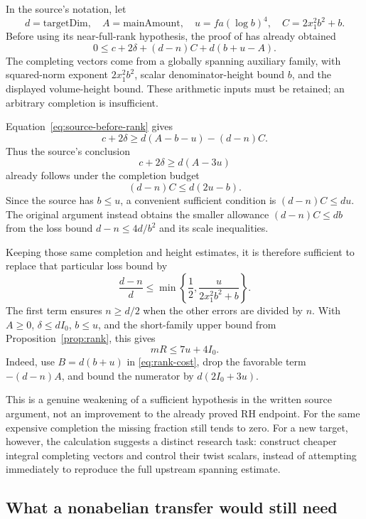 In the source's notation, let
\[
 d=\mathrm{targetDim},\quad A=\mathrm{mainAmount},\quad
 u=fa(\log b)^4,\quad C=2x_1^2b^2+b.
\]
Before using its near-full-rank hypothesis, the proof of  has already obtained
\begin{equation}\label{eq:source-before-rank}
 0\le c+2\delta+(d-n)C+d(b+u-A).
\end{equation}
The completing vectors come from a globally spanning auxiliary family, with squared-norm exponent $2x_1^2b^2$, scalar denominator-height bound $b$, and the displayed volume-height bound. These arithmetic inputs must be retained; an arbitrary completion is insufficient.\cite{long_source}

Equation~\eqref{eq:source-before-rank} gives
\[
 c+2\delta\ge d(A-b-u)-(d-n)C.
\]
Thus the source's conclusion
\[
                         c+2\delta\ge d(A-3u)
\]
already follows under the completion budget
\begin{equation}\label{eq:weaker-spanning}
                  (d-n)C\le d(2u-b).
\end{equation}
Since the source has $b\le u$, a convenient sufficient condition is $(d-n)C\le du$. The original argument instead obtains the smaller allowance $(d-n)C\le db$ from the loss bound $d-n\le4d/b^2$ and its scale inequalities.

Keeping those same completion and height estimates, it is therefore sufficient to replace that particular loss bound by
\[
 \frac{d-n}{d}\le
      \min\left\{\frac12,\frac{u}{2x_1^2b^2+b}\right\}.
\]
The first term ensures $n\ge d/2$ when the other errors are divided by $n$. With $A\ge0$, $\delta\le dI_0$, $b\le u$, and the short-family upper bound from Proposition~\ref{prop:rank}, this gives
\[
                             mR\le7u+4I_0.
\]
Indeed, use $B=d(b+u)$ in \eqref{eq:rank-cost}, drop the favorable term $-(d-n)A$, and bound the numerator by $d(2I_0+3u)$.

This is a genuine weakening of a sufficient hypothesis in the written source argument, not an improvement to the already proved RH endpoint. For the same expensive completion the missing fraction still tends to zero. For a new target, however, the calculation suggests a distinct research task: construct cheaper integral completing vectors and control their twist scalars, instead of attempting immediately to reproduce the full upstream spanning estimate.

\subsection{What a nonabelian transfer would still need}

